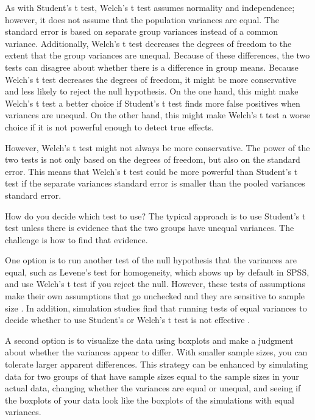 \documentclass[man,a4paper,noextraspace,apacite]{apa6}
\begin{document}
        As with Student's t test, Welch's t test assumes normality and independence; however, it does not assume that the population variances are equal. The standard error is based on separate group variances instead of a common variance. Additionally, Welch's t test decreases the degrees of freedom to the extent that the group variances are unequal. Because of these differences, the two tests can disagree about whether there is a difference in group means. Because Welch's t test decreases the degrees of freedom, it might be more conservative and less likely to reject the null hypothesis. On the one hand, this might make Welch's t test a better choice if Student's t test finds more false positives when variances are unequal. On the other hand, this might make Welch's t test a worse choice if it is not powerful enough to detect true effects. 
        
    However, Welch's t test might not always be more conservative. The power of the two tests is not only based on the degrees of freedom, but also on the standard error. This means that Welch's t test could be more powerful than Student's t test if the separate variances standard error is smaller than the pooled variances standard error. 
    
    How do you decide which test to use? The typical approach is to use Student's t test unless there is evidence that the two groups have unequal variances. The challenge is how to find that evidence. 

    One option is to run another test of the null hypothesis that the variances are equal, such as Levene's test for homogeneity, which shows up by default in SPSS, and use Welch's t test if you reject the null. However, these tests of assumptions make their own assumptions that go unchecked and they are sensitive to sample size \cite{Gonzalez2008}. In addition, simulation studies find that running tests of equal variances to decide whether to use Student's or Welch's t test is not effective \cite{Zimmerman1996,Zimmerman2004}. 

    A second option is to visualize the data using boxplots and make a judgment about whether the variances appear to differ.  With smaller sample sizes, you can tolerate larger apparent differences. This strategy can be enhanced by simulating data for two groups of that have sample sizes equal to the sample sizes in your actual data, changing whether the variances are equal or unequal, and seeing if the boxplots of your data look like the boxplots of the simulations with equal variances. 
\end{document}
